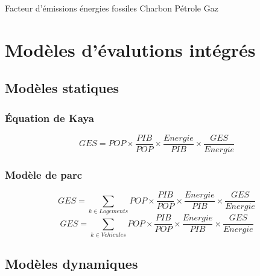 \documentclass{beamer}
\begin{document}
\begin{frame}{Facteur d'émissions énergies fossiles}
Charbon
Pétrole
Gaz
\end{frame}


\section{Modèles d'évalutions intégrés}
\subsection{Modèles statiques}
\begin{frame}
\frametitle{Équation de Kaya}
\begin{equation*}
GES=POP \times \frac{PIB}{POP} \times \frac{Energie}{PIB}\times \frac{GES}{Energie}
\end{equation*}
\end{frame}

\begin{frame}
\frametitle{Modèle de parc}
\begin{equation*}
GES=\sum_{k \in Logements}POP \times \frac{PIB}{POP} \times \frac{Energie}{PIB}\times \frac{GES}{Energie}
\end{equation*}
\begin{equation*}
GES=\sum_{k \in Vehicules }POP \times \frac{PIB}{POP} \times \frac{Energie}{PIB}\times \frac{GES}{Energie}
\end{equation*}
\end{frame}


 
\subsection{Modèles dynamiques}
\end{document}
